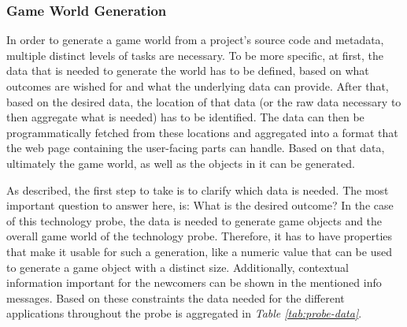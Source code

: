 \subsubsection{Game World Generation}

In order to generate a game world from a project's source code and metadata, multiple distinct levels of tasks are necessary. To be more specific, at first, the data that is needed to generate the world has to be defined, based on what outcomes are wished for and what the underlying data can provide. After that, based on the desired data, the location of that data (or the raw data necessary to then aggregate what is needed) has to be identified. The data can then be programmatically fetched from these locations and aggregated into a format that the web page containing the user-facing parts can handle. Based on that data, ultimately the game world, as well as the objects in it can be generated.


As described, the first step to take is to clarify which data is needed. The most important question to answer here, is: What is the desired outcome? In the case of this technology probe, the data is needed to generate game objects and the overall game world of the technology probe. Therefore, it has to have properties that make it usable for such a generation, like a numeric value that can be used to generate a game object with a distinct size. Additionally, contextual information important for the newcomers can be shown in the mentioned info messages. Based on these constraints the data needed for the different applications throughout the probe is aggregated in \textit{Table \ref{tab:probe-data}}.

